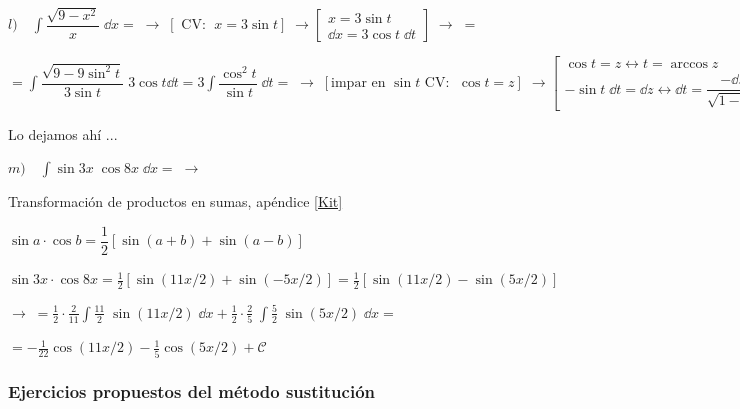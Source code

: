 {\begin{proofw}
\vspace{4mm}
$l) \quad \displaystyle \int \dfrac{\sqrt{9-x^2}}{x} \; \dd x =  \; \to \;  [\text { CV: } \; x=3 \sin t]\;  \to  \left[ \begin{matrix}
	x= 3 \sin t  \\
	\dd x = 3 \cos t \; 	\dd t 
	\end{matrix} \right] \; \to \; =$
	
	$= \int \dfrac{\sqrt{9-9 \sin^2 t}}{3 \sin t } \; 3 \cos t \dd t = 
	3\int \dfrac {\cos^2 t}{\sin t }\; \dd t = \; \to \; [\text {impar en } \sin t \text{  CV: } \;  \cos t =z]\;  \to \left[ \begin{matrix} \cos t = z \leftrightarrow t= \arccos z  \\ -\sin t \; \dd t = \dd z \leftrightarrow \dd t = \dfrac {-\dd z}{ \sqrt{1-z^2} } \ \end{matrix} \right] \; \to \; = 3\int \dfrac {z^2}{\sqrt{1-z^2}} \; \dfrac {- \dd z}{\sqrt{1-z^2}}=  3 \int \dfrac {\textbf{+1}-z^2\textbf{-1}}{1-z^2} \; \dd z = 3\int \left( 1- \dfrac {-1}{1-z^2} \right)\; \dd z = 3z + \frac 3 2 \arctan z = 3\cos t + \frac 3 2 \arctan (\cos t)=
	3 \cos (\arcsin (x/3)) + \frac 3 2 \arctan (\cos (\arcsin (x/3))) + \mathcal C \qquad$ 
	
	\textcolor{gris}{ Lo dejamos ahí ...}

\vspace{4mm}
$m) \quad \displaystyle \int \sin3x \; \cos 8x  \; \dd x =\; \to $

\textcolor{gris}{\hspace {10mm} Transformación de productos en sumas, apéndice \ref{Kit}}

\textcolor{gris}{\hspace {10mm}$\sin a \cdot \cos b= \dfrac 1 2 [\sin(a+b)+\sin(a-b)]$}

\textcolor{gris}{\hspace {10mm} $\sin 3x \cdot \cos 8x = \frac 1 2 [ \sin (11x/2) + \sin (-5x/2)]= \frac 1 2 [ \sin (11x/2) - \sin (5x/2)]$}

$\to \; = \displaystyle \frac 1 2 \cdot \frac  {2} {11} \int \frac {11} {2}\;  \sin(11x/2)\; \dd x + \frac 1 2 \cdot \frac 2 5 \; \int  \frac 5 2  \; \sin (5x/2) \; \dd x =$

$=\displaystyle -\frac {1}{22} \cos (11x/2) - \frac {1}{5} \cos (5x/2)+\mathcal C$
	
\end{proofw}

\subsubsection{Ejercicios propuestos del método sustitución}

}
